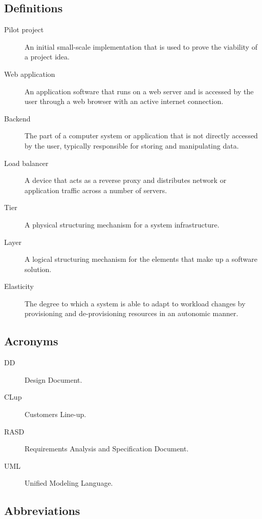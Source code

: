 \documentclass[../../main.tex]{subfiles}
\begin{document}
\subsection{Definitions}

\begin{description}
    \item[Pilot project] An initial small-scale implementation that is used to 
    prove the viability of a project idea.

    \item[Web application] An application software that runs on a web server and is 
    accessed by the user through a web browser with an active internet connection.

    \item[Backend] The part of a computer system or application that 
    is not directly accessed by the user, typically responsible for 
    storing and manipulating data.

    \item[Load balancer] A device that acts as a reverse proxy and 
    distributes network or application traffic across a number of servers.

    \item[Tier] A physical structuring mechanism for a system infrastructure.

    \item[Layer] A logical structuring mechanism for the elements that make up a software solution.
     
    \item[Elasticity] The degree to which a system is able to adapt to workload changes by provisioning and de-provisioning resources in an autonomic manner.
\end{description}

\subsection{Acronyms}

\begin{description}

    \item[DD] Design Document.
    
    \item[CLup] Customers Line-up.
    
    \item[RASD] Requirements Analysis and Specification Document.
    
    \item[UML] Unified Modeling Language.

\end{description}

\subsection{Abbreviations}
\end{document}
